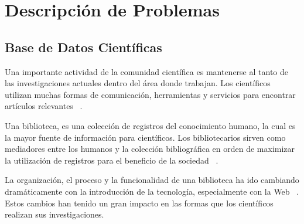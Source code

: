 \documentclass[12pt,oneside,letterpaper]{book}
\newcommand{\eng}[1]{\textit{#1}\xspace}			%
\theoremstyle{definition}
\begin{document}
\chapter{Descripción de Problemas}
\section{Base de Datos Científicas}
\label{sec:base_de_datos_cientificas}

Una importante actividad de la comunidad científica es mantenerse al tanto de las investigaciones actuales dentro
del área donde trabajan. Los científicos utilizan muchas formas de comunicación, herramientas y servicios para encontrar artículos relevantes ~\cite{hoggan2002, tenopir2001}.

Una biblioteca, es una colección de registros del conocimiento humano, la cual es la mayor fuente de información para científicos. Los bibliotecarios sirven como mediadores entre los humanos y la colección bibliográfica en orden de maximizar la utilización de registros para el beneficio de la sociedad ~\cite{marsterson1986}.

La organización, el proceso y la funcionalidad de una biblioteca ha ido cambiando dramáticamente con la introducción de la tecnología, especialmente con la Web ~\cite{saunders1993}. Estos cambios han tenido un gran impacto en las formas que los científicos realizan sus investigaciones.
\end{document}

